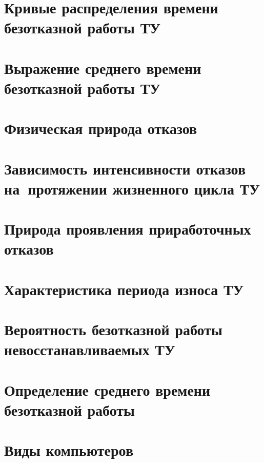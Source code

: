 \documentclass[
	a4paper,
	oneside,
	DIV = 14,
	fontsize = 14pt,
	headings = normal,
]{scrartcl}
\begin{document}
	\section{Кривые распределения времени безотказной работы ТУ}

	\section{Выражение среднего времени безотказной работы ТУ}

	\section{Физическая природа отказов}

	\section{Зависимость интенсивности отказов на~протяжении жизненного цикла ТУ}

	\section{Природа проявления приработочных отказов}

	\section{Характеристика периода износа ТУ}

	\section{Вероятность безотказной работы невосстанавливаемых ТУ}

	\section{Определение среднего времени безотказной работы}

	\section{Виды компьютеров}
\end{document}
